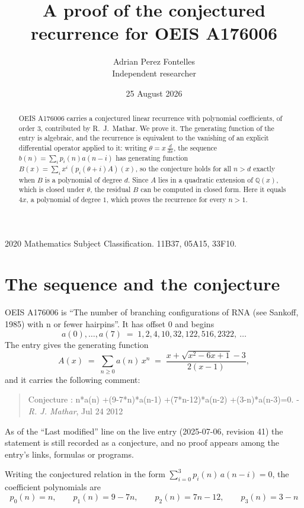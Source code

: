 \documentclass[11pt,a4paper]{article}
\title{A proof of the conjectured recurrence for OEIS A176006}
\author{Adrian Perez Fontelles\\ \small Independent researcher}
\date{25 August 2026}
\theoremstyle{plain}
\theoremstyle{definition}
\begin{document}
\maketitle

\begin{abstract}
OEIS A176006 carries a conjectured linear recurrence with polynomial coefficients, of
order 3, contributed by R.~J.~Mathar. We prove it. The generating function of the
entry is algebraic, and the recurrence is equivalent to the vanishing of an explicit
differential operator applied to it: writing $\theta=x\,\frac{d}{dx}$, the sequence
$b(n)=\sum_{i}p_{i}(n)a(n-i)$ has generating function
$B(x)=\sum_{i}x^{i}\,(p_{i}(\theta+i)A)(x)$, so the conjecture holds for all $n>d$ exactly
when $B$ is a polynomial of degree $d$. Since $A$ lies in a quadratic extension of
$\mathbb{Q}(x)$, which is closed under $\theta$, the residual $B$ can be computed in
closed form. Here it equals $4 x$, a polynomial of degree $1$, which proves
the recurrence for every $n>1$.
\end{abstract}

\noindent\small 2020 Mathematics Subject Classification. 11B37, 05A15, 33F10.\normalsize

\section{The sequence and the conjecture}

OEIS A176006 is ``The number of branching configurations of RNA (see Sankoff, 1985) with n or fewer hairpins''. It has offset $0$ and begins
\[
a(0),\dots,a(7)\;=\;1, 2, 4, 10, 32, 122, 516, 2322,\ \dots
\]
The entry gives the generating function
\begin{equation}\label{eq:gf}
A(x)\;=\;\sum_{n\ge 0} a(n)\,x^{n}\;=\;\frac{x + \sqrt{x^{2} - 6 x + 1} - 3}{2 \left(x - 1\right)} ,
\end{equation}
and it carries the following comment:
\begin{quote}\small
Conjecture : n*a(n) +(9-7*n)*a(n-1) +(7*n-12)*a(n-2) +(3-n)*a(n-3)=0. - \emph{R. J. Mathar}, Jul 24 2012
\end{quote}
As of the ``Last modified'' line on the live entry (2025-07-06, revision 41) the
statement is still recorded as a conjecture, and no proof appears among the entry's links,
formulas or programs.

Writing the conjectured relation in the form $\sum_{i=0}^{3}p_{i}(n)\,a(n-i)=0$,
the coefficient polynomials are
\[
p_{0}(n)=n,\qquad p_{1}(n)=9 - 7 n,\qquad p_{2}(n)=7 n - 12,\qquad p_{3}(n)=3 - n
\]
\end{document}
